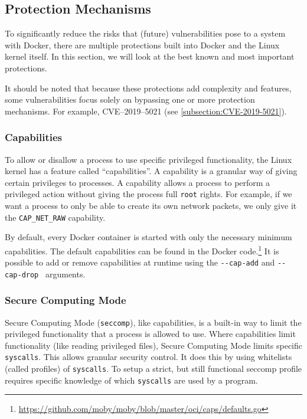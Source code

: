 \subsection{Protection Mechanisms}
To significantly reduce the risks that (future) vulnerabilities pose to a system with Docker, there are multiple protections built into Docker and the Linux kernel itself. In this section, we will look at the best known and most important protections.

\medskip

It should be noted that because these protections add complexity and features, some vulnerabilities focus solely on bypassing one or more protection mechanisms. For example, CVE--2019--5021 (see \autoref{subsection:CVE-2019-5021}).

\subsubsection{Capabilities}\label{protection-mechanisms:subsection:capabilities}
To allow or disallow a process to use specific privileged functionality, the Linux kernel has a feature called ``capabilities''. A capability is a granular way of giving certain privileges to processes. A capability allows a process to perform a privileged action without giving the process full \lstinline{root} rights. For example, if we want a process to only be able to create its own network packets, we only give it the \lstinline{CAP_NET_RAW} capability.

\medskip

By default, every Docker container is started with only the necessary minimum capabilities. The default capabilities can be found in the Docker code.\footnote{\url{https://github.com/moby/moby/blob/master/oci/caps/defaults.go}} It is possible to add or remove capabilities at runtime using the \lstinline{--cap-add} and \lstinline{--cap-drop}~\cite{More-Secure-Non-Root-Container} arguments.

\subsubsection{Secure Computing Mode}
Secure Computing Mode (\lstinline{seccomp}), like capabilities, is a built-in way to limit the privileged functionality that a process is allowed to use. Where capabilities limit functionality (like reading privileged files), Secure Computing Mode limits specific \lstinline{syscalls}. This allows granular security control. It does this by using whitelists (called profiles) of \lstinline{syscalls}.
To setup a strict, but still functional seccomp profile requires specific knowledge of which \lstinline{syscalls} are used by a program.

